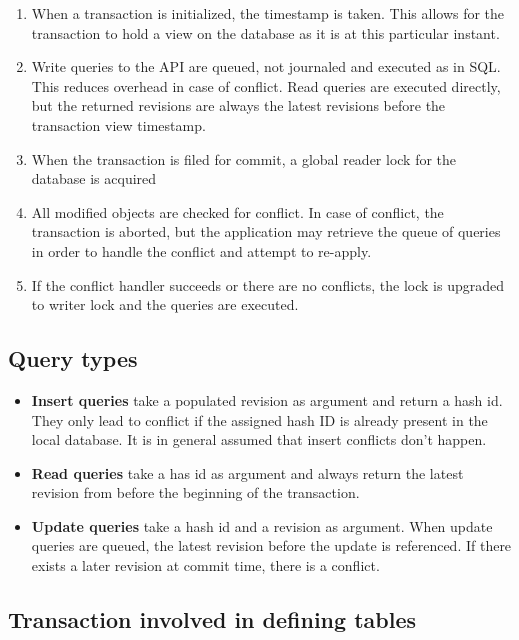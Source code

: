 \documentclass{article}
\begin{document}
\begin{enumerate} \itemsep0em
  \item When a transaction is initialized, the timestamp is taken. This allows
    for the transaction to hold a view on the database as it is at this
    particular instant.
  \item Write queries to the API are queued, not journaled and executed as in 
    SQL. This reduces overhead in case of conflict. Read queries are executed
    directly, but the returned revisions are always the latest revisions before
    the transaction view timestamp.
  \item When the transaction is filed for commit, a global reader lock for the
    database is acquired 
  \item All modified objects are checked for conflict. In case of conflict,
    the transaction is aborted, but the application may retrieve the queue of
    queries in order to handle the conflict and attempt to re-apply.
  \item If the conflict handler succeeds or there are no conflicts, the lock
    is upgraded to writer lock and the
    queries are executed.
\end{enumerate}

\subsection{Query types}

\begin{itemize} \itemsep0em
  \item {\bf Insert queries} take a populated revision as argument and return
    a hash id. They only lead to conflict if the assigned hash ID is
    already present in the local database. It is in general assumed that insert
    conflicts don't happen.
  \item {\bf Read queries} take a has id as argument and
    always return the latest revision from before the
    beginning of the transaction. 
  \item {\bf Update queries} take a hash id and a revision as argument. 
    When update queries are queued, the latest
    revision before the update is referenced. If there exists a later revision 
    at commit time, there is a conflict.
\end{itemize}

\subsection{Transaction involved in defining tables}\label{define-trans}
\end{document}
